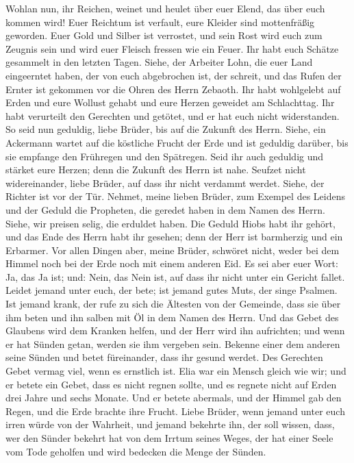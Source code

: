  Wohlan nun, ihr Reichen, weinet und heulet über euer
Elend, das über euch kommen wird!  Euer Reichtum ist
verfault, eure Kleider sind mottenfräßig geworden.  Euer
Gold und Silber ist verrostet, und sein Rost wird euch zum Zeugnis sein
und wird euer Fleisch fressen wie ein Feuer. Ihr habt euch Schätze
gesammelt in den letzten Tagen.  Siehe, der Arbeiter Lohn,
die euer Land eingeerntet haben, der von euch abgebrochen ist, der
schreit, und das Rufen der Ernter ist gekommen vor die Ohren des Herrn
Zebaoth.  Ihr habt wohlgelebt auf Erden und eure Wollust
gehabt und eure Herzen geweidet am Schlachttag.  Ihr habt
verurteilt den Gerechten und getötet, und er hat euch nicht
widerstanden.  So seid nun geduldig, liebe Brüder, bis auf
die Zukunft des Herrn. Siehe, ein Ackermann wartet auf die köstliche
Frucht der Erde und ist geduldig darüber, bis sie empfange den Frühregen
und den Spätregen.  Seid ihr auch geduldig und stärket
eure Herzen; denn die Zukunft des Herrn ist nahe.  Seufzet
nicht widereinander, liebe Brüder, auf dass ihr nicht verdammt werdet.
Siehe, der Richter ist vor der Tür.  Nehmet, meine lieben
Brüder, zum Exempel des Leidens und der Geduld die Propheten, die
geredet haben in dem Namen des Herrn.  Siehe, wir preisen
selig, die erduldet haben. Die Geduld Hiobs habt ihr gehört, und das
Ende des Herrn habt ihr gesehen; denn der Herr ist barmherzig und ein
Erbarmer.  Vor allen Dingen aber, meine Brüder, schwöret
nicht, weder bei dem Himmel noch bei der Erde noch mit einem anderen
Eid. Es sei aber euer Wort: Ja, das Ja ist; und: Nein, das Nein ist, auf
dass ihr nicht unter ein Gericht fallet.  Leidet jemand
unter euch, der bete; ist jemand gutes Muts, der singe Psalmen.
 Ist jemand krank, der rufe zu sich die Ältesten von der
Gemeinde, dass sie über ihm beten und ihn salben mit Öl in dem Namen des
Herrn.  Und das Gebet des Glaubens wird dem Kranken
helfen, und der Herr wird ihn aufrichten; und wenn er hat Sünden getan,
werden sie ihm vergeben sein.  Bekenne einer dem anderen
seine Sünden und betet füreinander, dass ihr gesund werdet. Des
Gerechten Gebet vermag viel, wenn es ernstlich ist.  Elia
war ein Mensch gleich wie wir; und er betete ein Gebet, dass es nicht
regnen sollte, und es regnete nicht auf Erden drei Jahre und sechs
Monate.  Und er betete abermals, und der Himmel gab den
Regen, und die Erde brachte ihre Frucht.  Liebe Brüder,
wenn jemand unter euch irren würde von der Wahrheit, und jemand bekehrte
ihn,  der soll wissen, dass, wer den Sünder bekehrt hat
von dem Irrtum seines Weges, der hat einer Seele vom Tode geholfen und
wird bedecken die Menge der Sünden.
